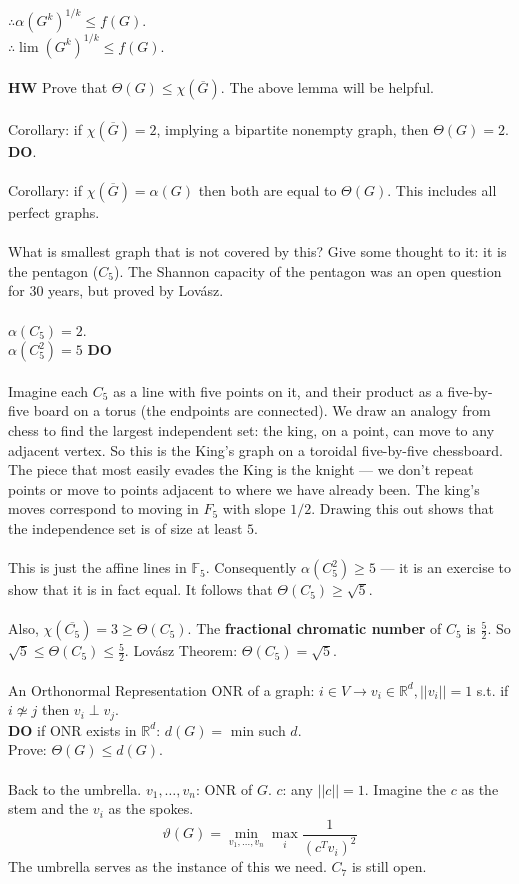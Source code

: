 \documentclass[12pt]{article}
\theoremstyle{remark}
\newcommand{\R}{\mathbb{R}}
\newcommand{\F}{\mathbb{F}}
\begin{document}
\begin{section}
\\ $\therefore \alpha (G^k)^{1/k} \leq f(G).$
\\ $\therefore \lim (G^k)^{1/k} \leq f(G)$. 
\\\\
\textbf{HW} Prove that $\Theta(G) \leq \chi(\overline{G})$. The above lemma will be helpful.
\\\\
Corollary: if $\chi(\overline{G}) = 2$, implying a bipartite nonempty graph, then $\Theta(G) = 2$. \textbf{DO}.
\\\\
Corollary: if $\chi(\overline{G}) = \alpha(G)$ then both are equal to $\Theta(G)$. This includes all perfect graphs.
\\\\
What is smallest graph that is not covered by this? Give some thought to it: it is the pentagon ($C_5$). The Shannon capacity of the pentagon was an open question for 30 years, but proved by Lov\'asz.
\\\\
$\alpha(C_5) = 2$.
\\$\alpha(C_5^2) = 5$ \textbf{DO}
\\\\
Imagine each $C_5$ as a line with five points on it, and their product as a five-by-five board on a torus (the endpoints are connected). We draw an analogy from chess to find the largest independent set: the king, on a point, can move to any adjacent vertex. So this is the King's graph on a toroidal five-by-five chessboard. The piece that most easily evades the King is the knight --- we don't repeat points or move to points adjacent to where we have already been. The king's moves correspond to moving in $F_5$ with slope $1/2$. Drawing this out shows that the independence set is of size at least $5$.  
\\\\This is just the affine lines in $\F_5$. Consequently $\alpha(C_5^2)  \geq 5$ --- it is an exercise to show  that it is in fact equal. It follows that $\Theta(C_5) \geq \sqrt{5}$.
\\\\
Also, $\chi(\overline{C_5}) = 3 \geq \Theta(C_5)$. The \textbf{fractional chromatic number }of $C_5$ is $\frac 5 2$. So $\sqrt{5} \leq \Theta(C_5) \leq \frac 5 2$. Lov\'asz Theorem: $\Theta(C_5) = \sqrt{5}$. 
\\\\
An Orthonormal Representation ONR of a graph: $i \in V \to v_i \in \R^d, ||v_i|| = 1$ s.t. if $i \not \simeq j$ then $v_i \perp v_j$. 
\\\textbf{DO} if ONR exists in $\R^d$: $d(G) =$ min such $d$. 
\\Prove: $\Theta(G) \leq d(G)$. 
\\\\
Back to the umbrella. $v_1,\ldots, v_n$: ONR of $G$. $c$: any $||c|| = 1$. Imagine the $c$ as the stem and the $v_i$ as the spokes. 
$$\vartheta(G) = \min_{v_1,\ldots,v_n} \max_i \frac{1}{(c^Tv_i)^2}$$
The umbrella serves as the instance of this we need.
$C_7$ is still open.
\end{section}
\end{document}
